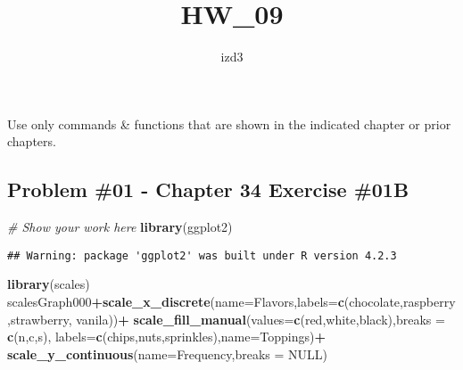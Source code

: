 \documentclass[
]{article}
\title{HW\_09}
\author{izd3}
\date{}
\newenvironment{Shaded}{\begin{snugshade}}{\end{snugshade}}
\newcommand{\AttributeTok}[1]{\textcolor[rgb]{0.13,0.29,0.53}{#1}}
\newcommand{\CommentTok}[1]{\textcolor[rgb]{0.56,0.35,0.01}{\textit{#1}}}
\newcommand{\ConstantTok}[1]{\textcolor[rgb]{0.56,0.35,0.01}{#1}}
\newcommand{\FunctionTok}[1]{\textcolor[rgb]{0.13,0.29,0.53}{\textbf{#1}}}
\newcommand{\NormalTok}[1]{#1}
\newcommand{\SpecialCharTok}[1]{\textcolor[rgb]{0.81,0.36,0.00}{\textbf{#1}}}
\newcommand{\StringTok}[1]{\textcolor[rgb]{0.31,0.60,0.02}{#1}}
\begin{document}
\maketitle

Use only commands \& functions that are shown in the indicated chapter
or prior chapters.

\newpage

\hypertarget{problem-01---chapter-34-exercise-01b}{%
\subsection{Problem \#01 - Chapter 34 Exercise
\#01B}\label{problem-01---chapter-34-exercise-01b}}

\begin{Shaded}
\begin{Highlighting}[]
\CommentTok{\# Show your work here}
\FunctionTok{library}\NormalTok{(ggplot2)}
\end{Highlighting}
\end{Shaded}

\begin{verbatim}
## Warning: package 'ggplot2' was built under R version 4.2.3
\end{verbatim}

\begin{Shaded}
\begin{Highlighting}[]
\FunctionTok{library}\NormalTok{(scales)}
\NormalTok{scalesGraph000}\SpecialCharTok{+}\FunctionTok{scale\_x\_discrete}\NormalTok{(}\AttributeTok{name=}\StringTok{\textquotesingle{}Flavors\textquotesingle{}}\NormalTok{,}\AttributeTok{labels=}\FunctionTok{c}\NormalTok{(}\StringTok{\textquotesingle{}chocolate\textquotesingle{}}\NormalTok{,}\StringTok{\textquotesingle{}raspberry\textquotesingle{}}\NormalTok{,}\StringTok{\textquotesingle{}strawberry\textquotesingle{}}\NormalTok{,}
                                                        \StringTok{\textquotesingle{}vanila\textquotesingle{}}\NormalTok{))}\SpecialCharTok{+}
  \FunctionTok{scale\_fill\_manual}\NormalTok{(}\AttributeTok{values=}\FunctionTok{c}\NormalTok{(}\StringTok{\textquotesingle{}red\textquotesingle{}}\NormalTok{,}\StringTok{\textquotesingle{}white\textquotesingle{}}\NormalTok{,}\StringTok{\textquotesingle{}black\textquotesingle{}}\NormalTok{),}\AttributeTok{breaks =} \FunctionTok{c}\NormalTok{(}\StringTok{\textquotesingle{}n\textquotesingle{}}\NormalTok{,}\StringTok{\textquotesingle{}c\textquotesingle{}}\NormalTok{,}\StringTok{\textquotesingle{}s\textquotesingle{}}\NormalTok{),}
                    \AttributeTok{labels=}\FunctionTok{c}\NormalTok{(}\StringTok{\textquotesingle{}chips\textquotesingle{}}\NormalTok{,}\StringTok{\textquotesingle{}nuts\textquotesingle{}}\NormalTok{,}\StringTok{\textquotesingle{}sprinkles\textquotesingle{}}\NormalTok{),}\AttributeTok{name=}\StringTok{\textquotesingle{}Toppings\textquotesingle{}}\NormalTok{)}\SpecialCharTok{+}
  \FunctionTok{scale\_y\_continuous}\NormalTok{(}\AttributeTok{name=}\StringTok{\textquotesingle{}Frequency\textquotesingle{}}\NormalTok{,}\AttributeTok{breaks =} \ConstantTok{NULL}\NormalTok{)}
\end{Highlighting}
\end{Shaded}
\end{document}
